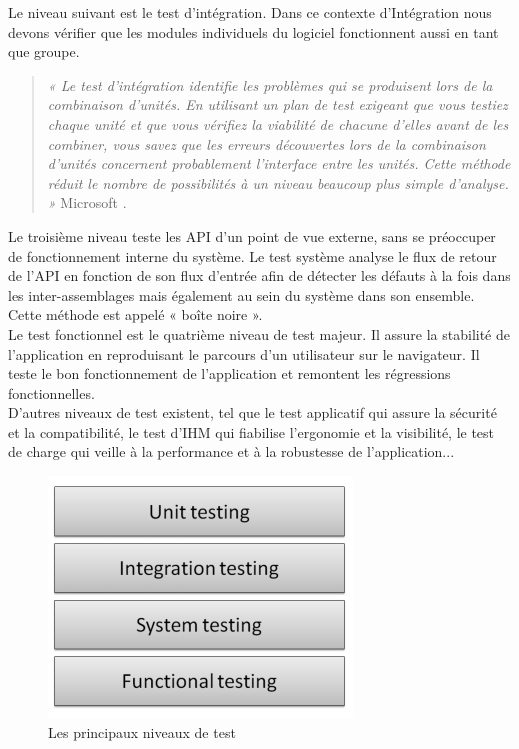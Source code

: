 \documentclass{report}
\begin{document}
        Le niveau suivant est le test d'intégration. Dans ce contexte d’Intégration nous devons vérifier que les modules individuels du logiciel fonctionnent aussi en tant que groupe.\\

        \begin{quotation}
          \emph{« Le test d'intégration identifie les problèmes qui se produisent lors de la combinaison d'unités. En utilisant un plan de test exigeant que vous testiez chaque unité et que vous vérifiez la viabilité de chacune d'elles avant de les combiner, vous savez que les erreurs découvertes lors de la combinaison d'unités concernent probablement l'interface entre les unités. Cette méthode réduit le nombre de possibilités à un niveau beaucoup plus simple d'analyse. »} Microsoft \cite{Mic16}.\\
        \end{quotation}

        Le troisième niveau teste les API d’un point de vue externe, sans se préoccuper de fonctionnement interne du système. Le test système analyse le flux de retour de l’API en fonction de son flux d’entrée afin  de détecter les défauts à la fois dans les inter-assemblages mais également au sein du système dans son ensemble. Cette méthode est appelé « boîte noire ».\\

	       Le test fonctionnel est le quatrième niveau de test majeur. Il assure la stabilité de l’application en reproduisant le parcours d’un utilisateur sur le navigateur. Il teste le bon fonctionnement de l’application et remontent les régressions fonctionnelles.\\

         D’autres niveaux de test existent, tel que le test applicatif qui assure la sécurité et la compatibilité, le test d’IHM qui fiabilise l’ergonomie et la visibilité, le test de charge qui veille à la performance et à la robustesse de l’application...

         \begin{figure}
           \begin{center}
             \includegraphics[scale=0.7]{images/testingLevels.png}
           \end{center}
           \caption{Les principaux niveaux de test}
           \label{Testing levels}
         \end{figure}
\end{document}
